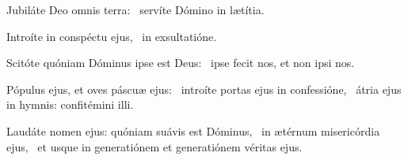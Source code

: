\item Jubiláte Deo omnis terra:~\psstar{} servíte Dómino in lætítia.

\item Introíte in conspéctu ejus,~\psstar{} in exsultatióne.

\item Scitóte quóniam Dóminus ipse est Deus:~\psstar{} ipse fecit nos, et non ipsi nos.

\item Pópulus ejus, et oves páscuæ ejus:~\pscross{} introíte portas ejus in confessióne,~\psstar{} átria ejus in hymnis: confitémini illi.

\item Laudáte nomen ejus: quóniam suávis est Dóminus,~\pscross{} in ætérnum misericórdia ejus,~\psstar{} et usque in generatiónem et generatiónem véritas ejus.